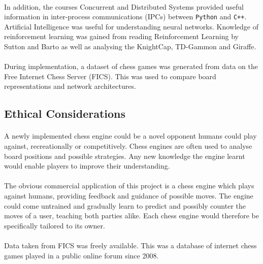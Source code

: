 \documentclass[12pt,a4paper]{book}
\begin{document}
\paragraph{} In addition, the courses Concurrent and Distributed Systems provided useful information in inter-process communications (IPCs) between \texttt{Python} and \texttt{C++}. Artificial Intelligence was useful for understanding neural networks. Knowledge of reinforcement learning was gained from reading Reinforcement Learning by Sutton and Barto as well as analysing the KnightCap, TD-Gammon and Giraffe.

\paragraph{} During implementation, a dataset of chess games was generated from data on the Free Internet Chess Server (FICS). This was used to compare board representations and network architectures.

\subsection{Ethical Considerations}

\paragraph{} A newly implemented chess engine could be a novel opponent humans could play against, recreationally or competitively. Chess engines are often used to analyse board positions and possible strategies. Any new knowledge the engine learnt would enable players to improve their understanding.

\paragraph{} The obvious commercial application of this project is a chess engine which plays against humans, providing feedback and guidance of possible moves. The engine could come untrained and gradually learn to predict and possibly counter the moves of a user, teaching both parties alike. Each chess engine would therefore be specifically tailored to its owner.

\paragraph{} Data taken from FICS was freely available. This was a database of internet chess games played in a public online forum since 2008. \cite{fics}
\end{document}
